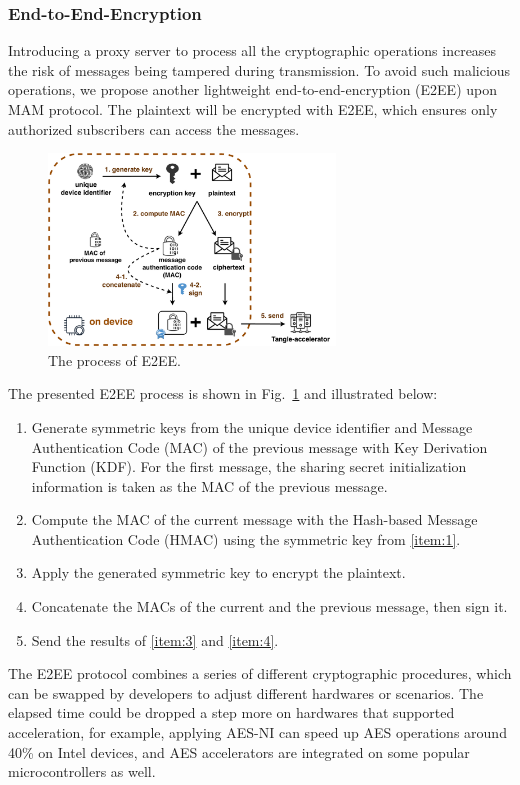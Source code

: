 \documentclass[10pt, conference, compsocconf]{IEEEtran}
\begin{document}
\subsubsection{End-to-End-Encryption}
Introducing a proxy server to process all the cryptographic operations increases the risk of messages being tampered during transmission. To avoid such malicious operations, we propose another lightweight end-to-end-encryption (E2EE) upon MAM protocol. The plaintext will be encrypted with E2EE, which ensures only authorized subscribers can access the messages.

\begin{figure}[!h]
    \centering
    \includegraphics[width=3in]{MAM_E2EE_fold}
    \caption{The process of E2EE.}
    \label{fig:MAM_E2EE}
\end{figure}

The presented E2EE process is shown in Fig.~\ref{fig:MAM_E2EE} and illustrated below:

\begin{enumerate}
    \item Generate symmetric keys from the unique device identifier and Message Authentication Code (MAC) of the previous message with Key Derivation Function (KDF). For the first message, the sharing secret initialization information is taken as the MAC of the previous message.\label{item:1}
    \item Compute the MAC of the current message with the Hash-based Message Authentication Code (HMAC) using the symmetric key from \ref{item:1}.
    \item Apply the generated symmetric key to encrypt the plaintext.\label{item:3}
    \item Concatenate the MACs of the current and the previous message, then sign it.\label{item:4}
    \item Send the results of \ref{item:3} and \ref{item:4}.
\end{enumerate}

The E2EE protocol combines a series of different cryptographic procedures, which can be swapped by developers to adjust different hardwares or scenarios. The elapsed time could be dropped a step more on hardwares that supported acceleration, for example, applying AES-NI can speed up AES operations around 40\% on Intel devices\cite{AES-NI-Acceleration}, and AES accelerators are integrated on some popular microcontrollers as well\cite{stm}.
\end{document}
